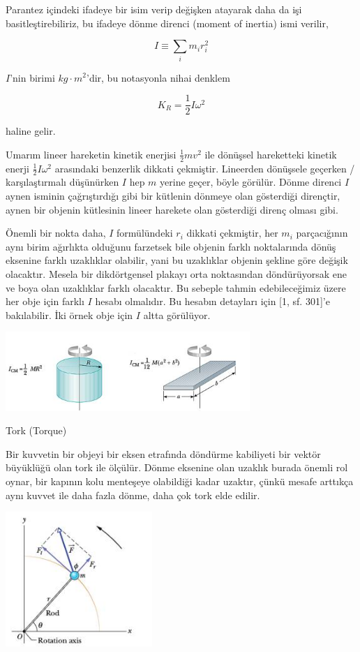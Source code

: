 \documentclass[12pt,fleqn]{article}\usepackage{../../common}
\begin{document}
Parantez içindeki ifadeye bir isim verip değişken atayarak daha da işi
basitleştirebiliriz, bu ifadeye dönme direnci (moment of inertia) ismi
verilir,

$$
I \equiv  \sum_i m_i r_i^2
$$

$I$'nin birimi $kg \cdot m^2$'dir, bu notasyonla nihai denklem

$$
K_R = \frac{1}{2} I \omega^2
$$

haline gelir. 

Umarım lineer hareketin kinetik enerjisi $\frac{1}{2} m v^2$ ile dönüşsel
hareketteki kinetik enerji $\frac{1}{2} I \omega^2$ arasındaki benzerlik
dikkati çekmiştir. Lineerden dönüşsele geçerken / karşılaştırmalı
düşünürken $I$ hep $m$ yerine geçer, böyle görülür. Dönme direnci $I$ aynen
isminin çağrıştırdığı gibi bir kütlenin dönmeye olan gösterdiği dirençtir,
aynen bir objenin kütlesinin lineer harekete olan gösterdiği direnç olması
gibi. 

Önemli bir nokta daha, $I$ formülündeki $r_i$ dikkati çekmiştir, her $m_i$
parçacığının aynı birim ağırlıkta olduğunu farzetsek bile objenin farklı
noktalarında dönüş eksenine farklı uzaklıklar olabilir, yani bu uzaklıklar
objenin şekline göre değişik olacaktır. Mesela bir dikdörtgensel plakayı
orta noktasından döndürüyorsak ene ve boya olan uzaklıklar farklı
olacaktır. Bu sebeple tahmin edebileceğimiz üzere her obje için farklı $I$
hesabı olmalıdır. Bu hesabın detayları için [1, sf. 301]'e bakılabilir. İki
örnek obje için $I$ altta görülüyor.

\includegraphics[width=25em]{phy_005_basics_02_11.jpg}


Tork (Torque)

Bir kuvvetin bir objeyi bir eksen etrafında döndürme kabiliyeti bir vektör
büyüklüğü olan tork ile ölçülür. Dönme eksenine olan uzaklık burada önemli
rol oynar, bir kapının kolu menteşeye olabildiği kadar uzaktır, çünkü
mesafe arttıkça aynı kuvvet ile daha fazla dönme, daha çok tork elde
edilir.

\includegraphics[width=15em]{phy_005_basics_02_12.jpg}
\end{document}
